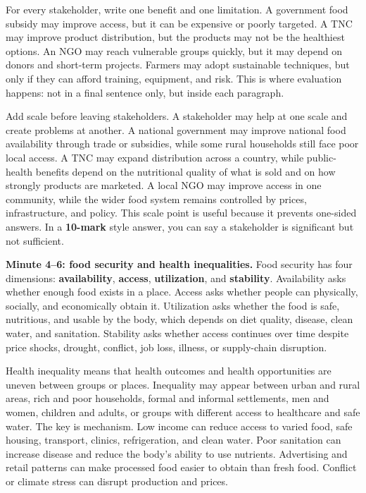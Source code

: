 \documentclass[11pt,a4paper]{article}
\newcommand{\term}[1]{\textcolor{HeadingBlue}{\textbf{#1}}}
\newcommand{\exam}[1]{\textcolor{AccentTeal}{\textbf{#1}}}
\begin{document}
For every stakeholder, write one benefit and one limitation. A government food
subsidy may improve access, but it can be expensive or poorly targeted. A TNC
may improve product distribution, but the products may not be the healthiest
options. An NGO may reach vulnerable groups quickly, but it may depend on
donors and short-term projects. Farmers may adopt sustainable techniques, but
only if they can afford training, equipment, and risk. This is where evaluation
happens: not in a final sentence only, but inside each paragraph.

Add scale before leaving stakeholders. A stakeholder may help at one scale and
create problems at another. A national government may improve national food
availability through trade or subsidies, while some rural households still face
poor local access. A TNC may expand distribution across a country, while
public-health benefits depend on the nutritional quality of what is sold and on
how strongly products are marketed. A local NGO may improve access in one
community, while the wider food system remains controlled by prices,
infrastructure, and policy. This scale point is useful because it prevents
one-sided answers. In a \exam{10-mark} style answer, you can say a stakeholder
is significant but not sufficient.

\textbf{Minute 4--6: food security and health inequalities.}
Food security has four dimensions: \term{availability}, \term{access},
\term{utilization}, and \term{stability}. Availability asks whether enough food
exists in a place. Access asks whether people can physically, socially, and
economically obtain it. Utilization asks whether the food is safe, nutritious,
and usable by the body, which depends on diet quality, disease, clean water,
and sanitation. Stability asks whether access continues over time despite price
shocks, drought, conflict, job loss, illness, or supply-chain disruption.

Health inequality means that health outcomes and health opportunities are
uneven between groups or places. Inequality may appear between urban and rural
areas, rich and poor households, formal and informal settlements, men and
women, children and adults, or groups with different access to healthcare and
safe water. The key is mechanism. Low income can reduce access to varied food,
safe housing, transport, clinics, refrigeration, and clean water. Poor
sanitation can increase disease and reduce the body's ability to use nutrients.
Advertising and retail patterns can make processed food easier to obtain than
fresh food. Conflict or climate stress can disrupt production and prices.
\end{document}

